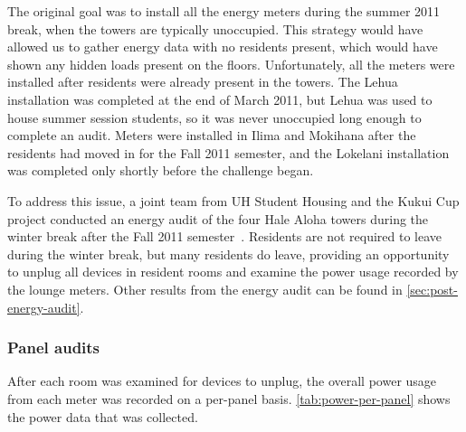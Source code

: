The original goal was to install all the energy meters during the summer 2011 break, when the towers are typically unoccupied. This strategy would have allowed us to gather energy data with no residents present, which would have shown any hidden loads present on the floors. Unfortunately, all the meters were installed after residents were already present in the towers. The Lehua installation was completed at the end of March 2011, but Lehua was used to house summer session students, so it was never unoccupied long enough to complete an audit. Meters were installed in Ilima and Mokihana after the residents had moved in for the Fall 2011 semester, and the Lokelani installation was completed only shortly before the challenge began.

To address this issue, a joint team from UH \Manoa Student Housing and the Kukui Cup project conducted an energy audit of the four Hale Aloha towers during the winter break after the Fall 2011 semester~\cite{csdl2-11-12}. Residents are not required to leave during the winter break, but many residents do leave, providing an opportunity to unplug all devices in resident rooms and examine the power usage recorded by the lounge meters. Other results from the energy audit can be found in \autoref{sec:post-energy-audit}.


\subsubsection{Panel audits}
\label{sec:panel-audits}

After each room was examined for devices to unplug, the overall power usage from each meter was recorded on a per-panel basis. \autoref{tab:power-per-panel} shows the power data that was collected.

